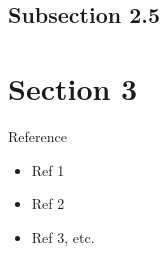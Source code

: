 \documentclass[aspectratio=169,11pt]{beamer}
\begin{document}
  
  \subsection{Subsection 2.5}
  \begin{frame}{}
  	\lipsum[7]
  \end{frame}
  




\section{Section 3}

\begin{frame}[t,plain]
	\lipsum[8]
\end{frame}






\begin{frame}[t, plain]{Reference}
  \begin{itemize}
    \item Ref 1
    \item Ref 2
    \item Ref 3, etc.
  \end{itemize}
\end{frame}
    
    
 
    
\end{document}

